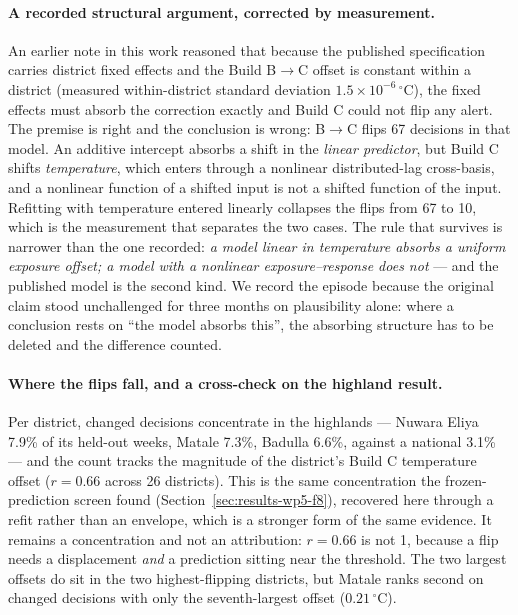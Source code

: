 \paragraph{A recorded structural argument, corrected by measurement.} An earlier note in this work reasoned that because the published specification carries district fixed effects and the Build B$\to$C offset is constant within a district (measured within-district standard deviation $1.5\times10^{-6}\,^{\circ}$C), the fixed effects must absorb the correction exactly and Build C could not flip any alert. The premise is right and the conclusion is wrong: B$\to$C flips 67 decisions in that model. An additive intercept absorbs a shift in the \emph{linear predictor}, but Build C shifts \emph{temperature}, which enters through a nonlinear distributed-lag cross-basis, and a nonlinear function of a shifted input is not a shifted function of the input. Refitting with temperature entered linearly collapses the flips from 67 to 10, which is the measurement that separates the two cases. The rule that survives is narrower than the one recorded: \emph{a model linear in temperature absorbs a uniform exposure offset; a model with a nonlinear exposure--response does not} --- and the published model is the second kind. We record the episode because the original claim stood unchallenged for three months on plausibility alone: where a conclusion rests on ``the model absorbs this'', the absorbing structure has to be deleted and the difference counted.

\paragraph{Where the flips fall, and a cross-check on the highland result.} Per district, changed decisions concentrate in the highlands --- Nuwara Eliya 7.9\% of its held-out weeks, Matale 7.3\%, Badulla 6.6\%, against a national 3.1\% --- and the count tracks the magnitude of the district's Build C temperature offset ($r=0.66$ across 26 districts). This is the same concentration the frozen-prediction screen found (Section~\ref{sec:results-wp5-f8}), recovered here through a refit rather than an envelope, which is a stronger form of the same evidence. It remains a concentration and not an attribution: $r=0.66$ is not 1, because a flip needs a displacement \emph{and} a prediction sitting near the threshold. The two largest offsets do sit in the two highest-flipping districts, but Matale ranks second on changed decisions with only the seventh-largest offset ($0.21\,^{\circ}$C).

